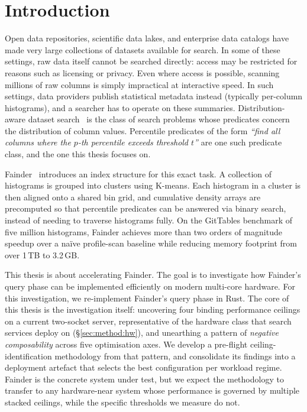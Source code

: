 \chapter{Introduction\label{cha:chapter1}}

Open data repositories, scientific data lakes, and enterprise data catalogs have made very large collections of datasets available for search. In some of these settings, raw data itself cannot be searched directly: access may be restricted for reasons such as licensing or privacy. Even where access is possible, scanning millions of raw columns is simply impractical at interactive speed. In such settings, data providers publish statistical metadata instead (typically per-column histograms), and a searcher has to operate on these summaries. Distribution-aware dataset search~\cite{behme_2024} is the class of search problems whose predicates concern the distribution of column values. Percentile predicates of the form \emph{``find all columns where the $p$-th percentile exceeds threshold $t$''} are one such predicate class, and the one this thesis focuses on.

Fainder~\cite{behme_2024} introduces an index structure for this exact task. A collection of histograms is grouped into clusters using K-means. Each histogram in a cluster is then aligned onto a shared bin grid, and cumulative density arrays are precomputed so that percentile predicates can be answered via binary search, instead of needing to traverse histograms fully. On the GitTables benchmark of five million histograms, Fainder achieves more than two orders of magnitude speedup over a na\"{i}ve profile-scan baseline while reducing memory footprint from over 1\,TB to 3.2\,GB.

This thesis is about accelerating Fainder. The goal is to investigate how Fainder's query phase can be implemented efficiently on modern multi-core hardware. For this investigation, we re-implement Fainder's query phase in Rust. The core of this thesis is the investigation itself: uncovering four binding performance ceilings on a current two-socket server, representative of the hardware class that search services deploy on (§\ref{sec:method:hw}), and unearthing a pattern of \emph{negative composability} across five optimisation axes. We develop a pre-flight ceiling-identification methodology from that pattern, and consolidate its findings into a deployment artefact that selects the best configuration per workload regime. Fainder is the concrete system under test, but we expect the methodology to transfer to any hardware-near system whose performance is governed by multiple stacked ceilings, while the specific thresholds we measure do not.

